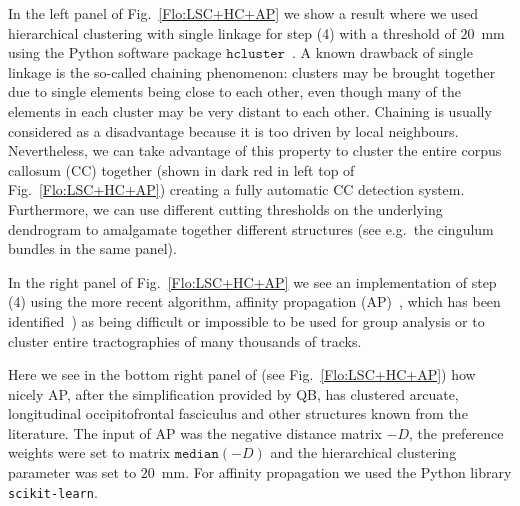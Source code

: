 \documentclass{bioinfo}
\begin{document}
In the left panel of Fig.~\ref{Flo:LSC+HC+AP} we show a result where we
used hierarchical clustering with single linkage for step (4) with a
threshold of $20$~mm using the Python software package
$\texttt{hcluster}$~\cite{eads-hcluster-software}. A known drawback of
single linkage is the so-called chaining phenomenon: clusters may be
brought together due to single elements being close to each other, even
though many of the elements in each cluster may be very distant to each
other. Chaining is usually considered as a disadvantage because it is
too driven by local neighbours. Nevertheless, we can take advantage of this
property to cluster the entire corpus callosum (CC) together (shown in
dark red in left top of Fig.~\ref{Flo:LSC+HC+AP}) creating a fully
automatic CC detection system.  Furthermore, we can use different
cutting thresholds on the underlying dendrogram to amalgamate together
different structures (see e.g.~the cingulum bundles in the same panel).

In the right panel of Fig.~\ref{Flo:LSC+HC+AP} we see an implementation
of step (4) using the more recent algorithm, affinity propagation
(AP)~\citep{dueck2009affinity}, which has been
identified~\citep{malcolm2009filtered}) as being difficult or impossible
to be used for group analysis or to cluster entire tractographies of
many thousands of tracks.

Here we see in the bottom right panel of (see Fig.~\ref{Flo:LSC+HC+AP})
how nicely AP, after the simplification provided by QB, has clustered
arcuate, longitudinal occipitofrontal fasciculus and other structures
known from the literature. The input of AP was the negative distance
matrix $-D$, the preference weights were set to matrix $\mathtt{median}(-D)$
and the hierarchical clustering parameter was set to $20$~mm.
For affinity propagation we used the Python library \texttt{scikit-learn}.
\end{document}
